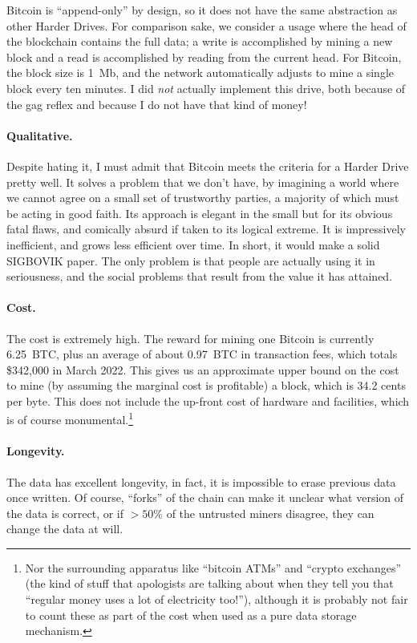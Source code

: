 \documentclass[twocolumn]{article}
\begin{document}
Bitcoin is ``append-only'' by design, so it does not have the same
abstraction as other Harder Drives. For comparison sake, we consider a
usage where the head of the blockchain contains the full data; a write
is accomplished by mining a new block and a read is accomplished by
reading from the current head. For Bitcoin, the block size is 1~Mb,
and the network automatically adjusts to mine a single block every ten
minutes. I did {\em not} actually implement this drive, both because
of the gag reflex and because I do not have that kind of money!

\paragraph{Qualitative.} Despite hating it, I must admit that Bitcoin
meets the criteria for a Harder Drive pretty well. It solves a problem
that we don't have, by imagining a world where we cannot agree on a
small set of trustworthy parties, a majority of which must be acting
in good faith. Its approach is elegant in the small but for its
obvious fatal flaws, and comically absurd if taken to its logical
extreme. It is impressively inefficient, and grows less efficient over
time. In short, it would make a solid SIGBOVIK paper. The only problem
is that people are actually using it in seriousness, and the social
problems that result from the value it has attained.

\paragraph{Cost.} The cost is extremely high. The reward for mining
one Bitcoin is currently 6.25~BTC, plus an average of about 0.97~BTC
in transaction fees, which totals \$342,000 in March 2022. This gives
us an approximate upper bound on the cost to mine (by assuming the
marginal cost is profitable) a block, which is 34.2 cents per byte.
This does not include the up-front cost of hardware and facilities,
which is of course monumental.\!\footnote{Nor the surrounding
  apparatus like ``bitcoin ATMs'' and ``crypto exchanges'' (the kind
  of stuff that apologists are talking about when they tell you that
  ``regular money uses a lot of electricity too!''), although it is
  probably not fair to count these as part of the cost when used as a
  pure data storage mechanism.}

\paragraph{Longevity.} The data has excellent longevity, in fact, it
is impossible to erase previous data once written. Of course,
``forks'' of the chain can make it unclear what version of the data is
correct, or if $>50\%$ of the untrusted miners disagree, they can
change the data at will.
\end{document}

